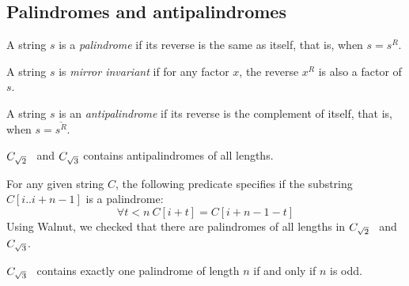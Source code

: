 \subsection{Palindromes and antipalindromes}
\begin{definition}
A string $s$ is a \emph{palindrome} if its reverse is the same as itself, that is, when $s = s^R$.
\end{definition}
\begin{definition}
A string $s$ is \emph{mirror invariant} if for any factor $x$, the reverse $x^R$ is also a factor of $s$.
\end{definition}
\begin{definition}
A string $s$ is an \emph{antipalindrome} if its reverse is the complement of itself, that is, when $s = \overline{s^R}$.
\end{definition}
\begin{theorem}
$C_{\sqrt{2}}$~ and $C_{\sqrt{3}}$ contains antipalindromes of all lengths.
\end{theorem}
For any given string $C$, the following predicate specifies if the substring $C[i..i+n-1]$ is a palindrome:
\[\forall t<n ~C[i+t] = C[i+n-1-t]\]
Using Walnut, we checked that there are palindromes of all lengths in $C_{\sqrt{2}}$~ and $C_{\sqrt{3}}$.
\begin{theorem}
$C_{\sqrt{3}}$ ~contains exactly one palindrome of length $n$ if and only if $n$ is odd. 
\end{theorem}
